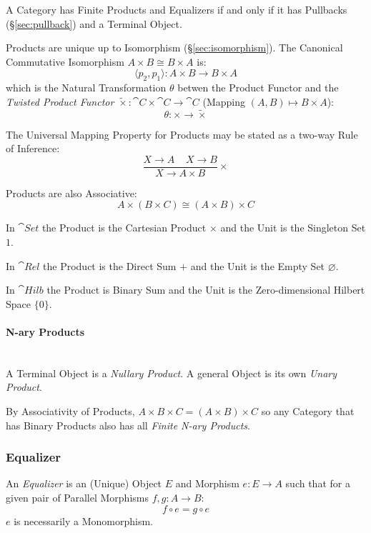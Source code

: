A Category has Finite Products and Equalizers if and only if it has
Pullbacks (\S\ref{sec:pullback}) and a Terminal Object. \cite{awodey06}

Products are unique up to Isomorphism (\S\ref{sec:isomorphism}). The
Canonical Commutative Isomorphism $A \times B \cong B \times A$ is:
\[
  \langle p_2, p_1 \rangle : A \times B \rightarrow B \times A
\]
which is the Natural Transformation $\theta$ betwen the Product
Functor and the \emph{Twisted Product Functor} $\tilde{\times} :
\cat{C} \times \cat{C} \rightarrow \cat{C}$ (Mapping $(A,B)
\mapsto B \times A$):
\[
  \theta : \times \rightarrow \tilde{\times}
\]

The Universal Mapping Property for Products may be stated as a two-way
Rule of Inference:
\[
  {
    \frac{X \rightarrow A \;\;\;\; X \rightarrow B}
    {X \rightarrow A \times B}
  }\times
\]

Products are also Associative:
\[
  A \times (B \times C) \cong (A \times B) \times C
\]

In $\cat{Set}$ the Product is the Cartesian Product $\times$ and the
Unit is the Singleton Set $1$.

In $\cat{Rel}$ the Product is the Direct Sum $+$ and the Unit is
the Empty Set $\varnothing$.

In $\cat{Hilb}$ the Product is Binary Sum and the Unit is the
Zero-dimensional Hilbert Space $\{ 0 \}$. %



\paragraph{N-ary Products}\label{sec:category_nary}
\hfill \\
A Terminal Object is a \emph{Nullary Product}. A general Object is its
own \emph{Unary Product}.

By Associativity of Products, $A \times B \times C = (A \times B)
\times C$ so any Category that has Binary Products also has all
\emph{Finite N-ary Products}.



\subsubsection{Equalizer}\label{sec:equalizer}

An \emph{Equalizer} is an (Unique) Object $E$ and Morphism $e: E
\rightarrow A$ such that for a given pair of Parallel Morphisms $f,g :
A \rightarrow B$:
\[
  f \circ e = g \circ e
\]
$e$ is necessarily a Monomorphism.

